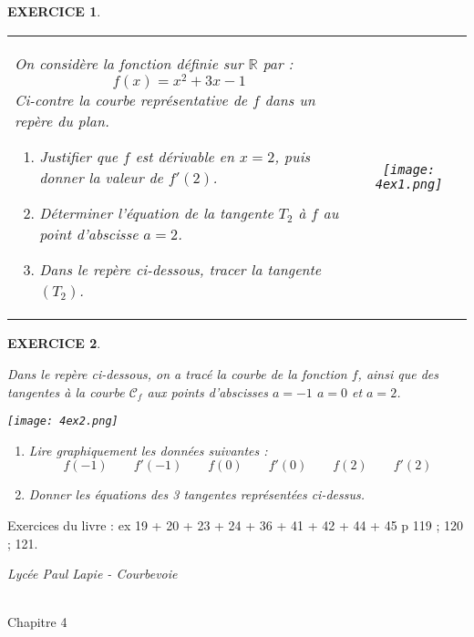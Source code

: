 \documentclass[a4paper]{article}   %
\renewcommand{\(}{\left(}
\renewcommand{\)}{\right)}
\newtheorem{EXO}{\large EXERCICE }
\newenvironment{EX}   { \setcounter{ques}{0} \begin{EXO} \hrulefill ~\vspace{0.3cm}

\normalfont}    {\end{EXO} \medskip}
\def\cl{{\large \bf{1èreG1}}}
\begin{document}
\begin{center} 	
\end{center}

\begin{EX}

\renewcommand{\tabularxcolumn}[1]{b{#1}}
\begin{tabularx}{\linewidth}{Xc}	
On considère la fonction définie sur $\mathbb{R}$ par : 
$$f(x)=x^2+3x-1$$Ci-contre la courbe représentative de $f$ dans un repère du plan. \vspace{0.5cm}
\begin{enumerate}
\item Justifier que $f$ est dérivable en $x=2$, puis donner la valeur de $f'(2)$. \vspace{0.5cm}
\item Déterminer l'équation de la tangente $T_{2}$ à $f$ au point d'abscisse $a=2$. \vspace{0.5cm}
\item Dans le repère ci-dessous, tracer la tangente $(T_2)$.
\end{enumerate}

&
\texttt{[image: 4ex1.png]}
\end{tabularx}

\end{EX}
\begin{EX}
Dans le repère ci-dessous, on a tracé la courbe de la fonction $f$, ainsi que des tangentes à la courbe $\mathcal{C}_f$ aux points d'abscisses $a=-1$ $a=0$ et $a=2$.
\begin{center}

\texttt{[image: 4ex2.png]}
\end{center}
\begin{enumerate}
\item Lire graphiquement les données suivantes : 
$$f(-1) \qquad f'(-1) \qquad f(0) \qquad f'(0) \qquad f(2) \qquad f'(2)$$
\item Donner les équations des 3 tangentes représentées ci-dessus.
\end{enumerate}

\end{EX}

Exercices du livre : ex 19 + 20 + 23 + 24 + 36 + 41 + 42 + 44 + 45 p 119 ; 120 ; 121.

\newpage

\noindent\begin{minipage}{.20\linewidth}\begin{center}                  
\noindent \emph{Lycée Paul Lapie - Courbevoie}
\end{center}\end{minipage}
\begin{minipage}{1.5\linewidth}\begin{center}	
\noindent \cl\\ Chapitre 4
\end{center}\end{minipage}
\end{document}
